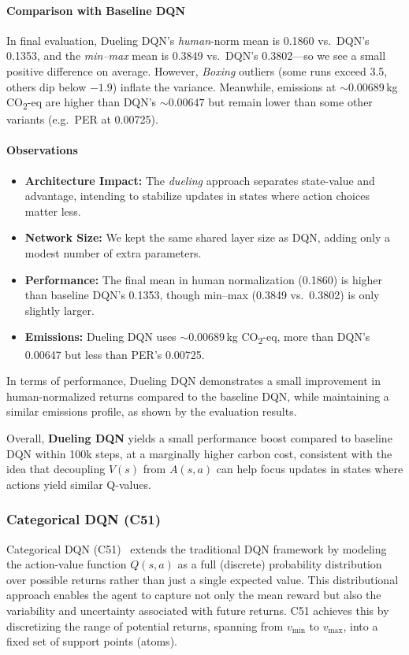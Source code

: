 \paragraph{Comparison with Baseline DQN}
In final evaluation, Dueling DQN’s \emph{human}-norm mean is 0.1860 vs.\ DQN’s 0.1353, 
and the \emph{min--max} mean is 0.3849 vs.\ DQN’s 0.3802—so we see a small positive difference on average.
However, \emph{Boxing} outliers (some runs exceed 3.5, others dip below $-1.9$) inflate the variance.
Meanwhile, emissions at $\sim0.00689$\,kg CO\textsubscript{2}-eq are higher than DQN’s $\sim0.00647$ but remain
lower than some other variants (e.g.\ PER at 0.00725).

\paragraph{Observations}
\begin{itemize}
	\item \textbf{Architecture Impact:}
	The \emph{dueling} approach separates state-value and advantage,
	intending to stabilize updates in states where action choices matter less.
	\item \textbf{Network Size:}
	We kept the same shared layer size as DQN, adding only a modest number of extra parameters.
	\item \textbf{Performance:}
	The final mean in human normalization (0.1860) is higher than baseline DQN’s 0.1353,
	though min--max (0.3849 vs.\ 0.3802) is only slightly larger.
	\item \textbf{Emissions:}
	Dueling DQN uses $\sim0.00689$\,kg CO\textsubscript{2}-eq,
	more than DQN’s 0.00647 but less than PER’s 0.00725.
\end{itemize}

In terms of performance, Dueling DQN demonstrates a small improvement in human-normalized returns compared to the baseline DQN, while maintaining a similar emissions profile, as shown by the evaluation results.

Overall, \textbf{Dueling DQN} yields a small performance boost compared to baseline DQN 
within 100k steps, at a marginally higher carbon cost, consistent with the idea 
that decoupling $V(s)$ from $A(s,a)$ can help focus updates in states 
where actions yield similar Q-values.

\subsubsection{Categorical DQN (C51)}
\label{subsubsec:c51}
Categorical DQN (C51)~\cite{bellemare:distributional} extends the traditional DQN framework by modeling the action-value function $Q(s,a)$ as a full (discrete) probability distribution over possible returns rather than just a single expected value. This distributional approach enables the agent to capture not only the mean reward but also the variability and uncertainty associated with future returns. C51 achieves this by discretizing the range of potential returns, spanning from $v_{\mathrm{min}}$ to $v_{\mathrm{max}}$, into a fixed set of support points (atoms).

